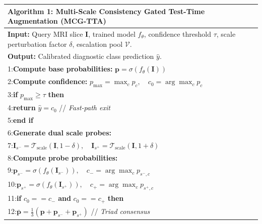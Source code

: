 \begin{table}[h]
\centering
\begin{tabular}{p{}}
\toprule
\textbf{Algorithm 1: Multi-Scale Consistency Gated Test-Time Augmentation (MCG-TTA)} \\
\midrule
\textbf{Input:} Query MRI slice $\mathbf{I}$, trained model $f_\theta$, confidence threshold $\tau$, scale perturbation factor $\delta$, escalation pool $\mathcal{V}$. \\
\textbf{Output:} Calibrated diagnostic class prediction $\hat{y}$. \\
\midrule
1:\hspace{1em}\textbf{Compute base probabilities:} $\mathbf{p} = \sigma(f_\theta(\mathbf{I}))$ \\[0.2ex]
2:\hspace{1em}\textbf{Compute confidence:} $p_{\max} = \max_c p_c, \quad c_0 = \arg\max_c p_c$ \\[0.2ex]
3:\hspace{1em}\textbf{if} $p_{\max} \ge \tau$ \textbf{then} \\[0.2ex]
4:\hspace{2em}\textbf{return} $\hat{y} = c_0$ \hfill // \emph{Fast-path exit} \\[0.2ex]
5:\hspace{1em}\textbf{end if} \\[0.2ex]
6:\hspace{1em}\textbf{Generate dual scale probes:} \\[0.2ex]
7:\hspace{2em}$\mathbf{I}_{s^-} = \mathcal{T}_{\text{scale}}(\mathbf{I}, 1 - \delta), \quad \mathbf{I}_{s^+} = \mathcal{T}_{\text{scale}}(\mathbf{I}, 1 + \delta)$ \\[0.2ex]
8:\hspace{1em}\textbf{Compute probe probabilities:} \\[0.2ex]
9:\hspace{2em}$\mathbf{p}_{s^-} = \sigma(f_\theta(\mathbf{I}_{s^-})), \quad c_- = \arg\max_c p_{s^-, c}$ \\[0.2ex]
10:\hspace{1.5em}$\mathbf{p}_{s^+} = \sigma(f_\theta(\mathbf{I}_{s^+})), \quad c_+ = \arg\max_c p_{s^+, c}$ \\[0.2ex]
11:\hspace{0.5em}\textbf{if} $c_0 == c_-$ \textbf{and} $c_0 == c_+$ \textbf{then} \\[0.2ex]
12:\hspace{1.5em}$\bar{\mathbf{p}} = \frac{1}{3}(\mathbf{p} + \mathbf{p}_{s^-} + \mathbf{p}_{s^+})$ \hfill // \emph{Triad consensus} \\[0.2ex]

\end{tabular}
\end{table}
